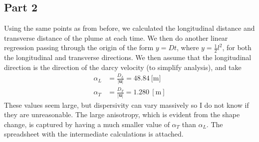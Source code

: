 \documentclass{article}
\begin{document}
\subsection{Part 2}
Using the same points as from before, we calculated the longitudinal distance and transverse distance of the plume at each time.
We then do another linear regression passing through the origin of the form  $y = Dt$, where $y = \frac{1}{2}l^2$, for both the longitudinal and transverse directions.
We then assume that the longitudinal direction is the direction of the darcy velocity (to simplify analysis), and take
\begin{align}
\alpha_L &= \frac{D_L}{|\mathbf{u}|} = 48.84\ [\mathrm{m]}\\
\alpha_T &= \frac{D_T}{|\mathbf{u}|} = 1.280\ [\mathrm{m}]
\end{align}
These values seem large, but dispersivity can vary massively so I do not know if they are unreasonable.
The large anisotropy, which is evident from the shape change, is captured by having a much smaller value of $\alpha_T$ than $\alpha_L$.
The spreadsheet with the intermediate calculations is attached.


% 
\end{document}
